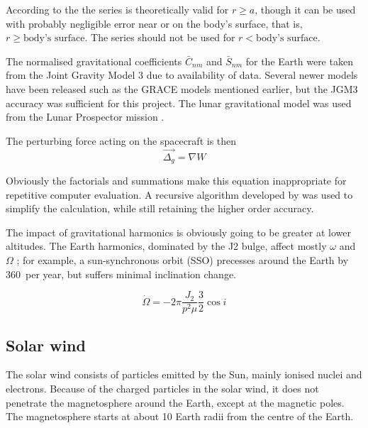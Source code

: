 According to the \textcite{WGS84} the series is theoretically valid for $r\geq a$, though it can be used with probably negligible error near or on the body's surface, that is, $r\geq\text{body's surface}$. The series should not be used for $r<\text{body's surface}$.

The normalised gravitational coefficients $\bar{C}_{nm}$ and $\bar{S}_{nm}$ for the Earth were taken from the Joint Gravity Model 3 \parencite[JGM3,][]{Tapley1996} due to availability of data. Several newer models have been released such as the GRACE models mentioned earlier, but the JGM3 accuracy was sufficient for this project. The lunar gravitational model was used from the Lunar Prospector mission \parencite{Konopliv2001}.

The perturbing force acting on the spacecraft is then
\begin{equation}\label{eq:Oblateness-perturbation}
\vec{\Delta_g}=\nabla W
\end{equation}

Obviously the factorials and summations make this equation inappropriate for repetitive computer evaluation. A recursive algorithm developed by \textcite{Montenbruck2000} was used to simplify the calculation, while still retaining the higher order accuracy. 

The impact of gravitational harmonics is obviously going to be greater at lower altitudes. The Earth harmonics, dominated by the J2 bulge, affect mostly $\omega$ and $\Omega$ \parencite{Eshagh2007, Montenbruck2000}; for example, a sun-synchronous orbit (SSO) precesses around the Earth by 360\degrees\ per year, but suffers minimal inclination change.

\begin{equation}
\dot\Omega = -2\pi\frac{J_2}{p^2\mu}\frac{3}{2}\cos i
\end{equation}




\subsection{Solar wind} \label{sub:Solar-Wind}

The solar wind consists of particles emitted by the Sun, mainly ionised nuclei and electrons. Because of the charged particles in the solar wind, it does not penetrate the magnetosphere around the Earth, except at the magnetic poles. The magnetosphere starts at about 10 Earth radii from the centre of the Earth.
 
